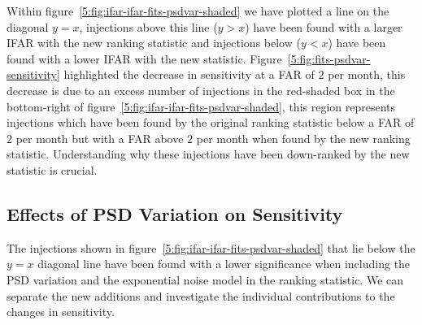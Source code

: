 %
Within figure~\ref{5:fig:ifar-ifar-fits-psdvar-shaded} we have plotted a line on the diagonal $y=x$, injections above this line ($y > x$) have been found with a larger IFAR with the new ranking statistic and injections below ($y < x$) have been found with a lower IFAR with the new statistic. Figure~\ref{5:fig:fits-psdvar-sensitivity} highlighted the decrease in sensitivity at a FAR of $2$ per month, this decrease is due to an excess number of injections in the red-shaded box in the bottom-right of figure~\ref{5:fig:ifar-ifar-fits-psdvar-shaded}, this region represents injections which have been found by the original ranking statistic below a FAR of $2$ per month but with a FAR above $2$ per month when found by the new ranking statistic. Understanding why these injections have been down-ranked by the new statistic is crucial.

\subsection{\label{5:sec:ignoring-psdvar}Effects of PSD Variation on Sensitivity}

The injections shown in figure~\ref{5:fig:ifar-ifar-fits-psdvar-shaded} that lie below the $y = x$ diagonal line have been found with a lower significance when including the PSD variation and the exponential noise model in the ranking statistic. We can separate the new additions and investigate the individual contributions to the changes in sensitivity.

